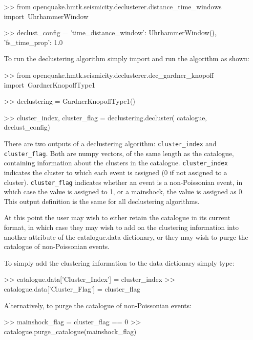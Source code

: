 \begin{python}[frame=single]
>> from openquake.hmtk.seismicity.declusterer.distance_time_windows import\
    UhrhammerWindow

>> declust_config = {
    'time_distance_window': UhrhammerWindow(),
    'fs_time_prop': 1.0}
\end{python}


To run the declustering algorithm simply import and run the algorithm as shown:

\begin{python}[frame=single]
>> from openquake.hmtk.seismicity.declusterer.dec_gardner_knopoff import\
    GardnerKnopoffType1

>> declustering = GardnerKnopoffType1()

>> cluster_index, cluster_flag = declustering.decluster(
    catalogue,
    declust_config)
\end{python}

There are two outputs of a declustering algorithm: \verb=cluster_index= and \verb=cluster_flag=. Both are numpy vectors, of the same length as the catalogue, containing information about the clusters in the catalogue. \verb=cluster_index= indicates the cluster to which each event is assigned (0 if not assigned to a cluster). \verb=cluster_flag= indicates whether an event is a non-Poissonian event, in which case the value is assigned to 1, or a mainshock, the value is assigned as 0. This output definition is the same for all declustering algorithms.

At this point the user may wish to either retain the catalogue in its current format, in which case they may wish to add on the clustering information into another attribute of the catalogue.data dictionary, or they may wish to purge the catalogue of non-Poissonian events. 

To simply add the clustering information to the data dictionary simply type:

\begin{python}[frame=single]
>> catalogue.data['Cluster_Index'] = cluster_index
>> catalogue.data['Cluster_Flag'] = cluster_flag
\end{python}
 
Alternatively, to purge the catalogue of non-Poissonian events:

\begin{python}[frame=single]
>> mainshock_flag = cluster_flag == 0
>> catalogue.purge_catalogue(mainshock_flag)
\end{python}


